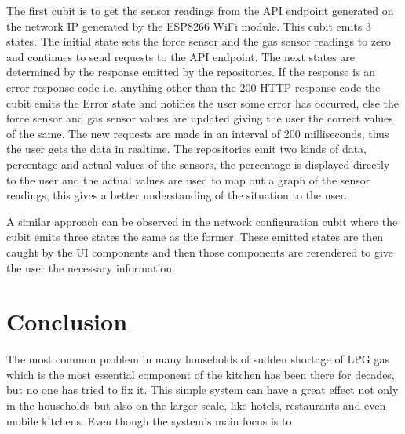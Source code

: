 \documentclass[conference]{IEEEtran}
\begin{document}
The first cubit is to get the sensor readings from the API endpoint
generated on the network IP generated by the ESP8266 WiFi module.
This cubit emits 3 states. The initial state sets the force sensor
and the gas sensor readings to zero and continues to send requests
to the API endpoint. The next states are determined by the response
emitted by the repositories. If the response is an error response
code i.e. anything other than the 200 HTTP response code the cubit
emits the Error state and notifies the user some error has occurred,
else the force sensor and gas sensor values are updated giving the user
the correct values of the same. The new requests are made in an interval
of 200 milliseconds, thus the user gets the data in realtime. The
repositories emit two kinds of data, percentage and actual values of
the sensors, the percentage is displayed directly to the user and the
actual values are used to map out a graph of the sensor readings, this gives
a better understanding of the situation to the user.

A similar approach can be observed in the network configuration cubit where
the cubit emits three states the same as the former. These emitted states
are then caught by the UI components and then those components are rerendered
to give the user the necessary information.

\section{Conclusion}
The most common problem in many households of sudden shortage of LPG
gas which is the most essential component of the kitchen has been there
for decades, but no one has tried to fix it. This simple system can have
a great effect not only in the households but also on the larger scale,
like hotels, restaurants and even mobile kitchens. Even though the system's
main focus is to


\end{document}
